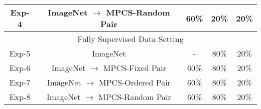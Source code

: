 \documentclass[conference]{IEEEtran}
\begin{document}
\begin{table}[t]
{\begin{tabular}{ccccc}
\multicolumn{1}{c|}{Exp-4}                      & \multicolumn{1}{c|}{ImageNet $\to$ MPCS-Random Pair}  & \multicolumn{1}{c|}{60\%}                                                                                  & \multicolumn{1}{c|}{20\%}                                & 20\%                               \\ \hline
\multicolumn{5}{c}{Fully Supervised Data Setting}                                                                                                                                                                                                                                                                             \\ \hline
\multicolumn{1}{c|}{Exp-5}                      & \multicolumn{1}{c|}{ImageNet}                                      & \multicolumn{1}{c|}{-}                                                                                     & \multicolumn{1}{c|}{80\%}                                & 20\%                               \\
\multicolumn{1}{c|}{Exp-6}                      & \multicolumn{1}{c|}{ImageNet $\to$ MPCS-Fixed Pair} & \multicolumn{1}{c|}{60\%}                                                                                  & \multicolumn{1}{c|}{80\%}                                & 20\%                               \\
\multicolumn{1}{c|}{Exp-7}                      & \multicolumn{1}{c|}{ImageNet $\to$ MPCS-Ordered Pair}  & \multicolumn{1}{c|}{60\%}                                                                                  & \multicolumn{1}{c|}{80\%}                                & 20\%                               \\
\multicolumn{1}{c|}{Exp-8}                      & \multicolumn{1}{c|}{ImageNet $\to$ MPCS-Random Pair}  & \multicolumn{1}{c|}{60\%}                                                                                  & \multicolumn{1}{c|}{80\%}                                & 20\%                               \\ \hline
\end{tabular}}
\vspace{-2mm}
\end{table}
\end{document}
